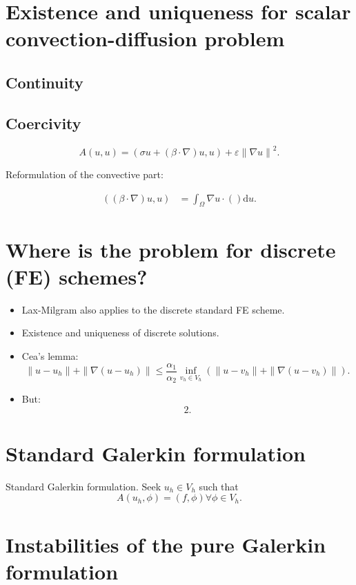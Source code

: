 \documentclass[
	a4paper,
	11pt,
	oneside
]{scrreprt}
\theoremstyle{definition}
\begin{document}
\section{Existence and uniqueness for scalar convection-diffusion problem}

\subsection{Continuity}

\subsection{Coercivity}

\[ A\left(u,u\right)=\left(\sigma u+\left(\beta\cdot\nabla\right) u,u\right)+\varepsilon{\|\nabla u\|}^{2}. \]

Reformulation of the convective part:

\begin{align*}
	\left(\left(\beta\cdot\nabla\right)u,u\right)&=\int_{\Omega}\nabla u\cdot\left(\right)\mathrm{d}u.
\end{align*}

\section{Where is the problem for discrete (FE) schemes?}

\begin{itemize}
	\item Lax-Milgram also applies to the discrete standard FE scheme.
	\item Existence and uniqueness of discrete solutions.
	\item Cea's lemma: \[ \|u-u_{h}\|+\|\nabla\left(u-u_{h}\right)\|\leq\frac{\alpha_{1}}{\alpha_{2}}\inf_{v_{h}\in V_{h}}\left(\|u-v_{h}\|+\|\nabla(u-v_{h})\|\right). \]
	\item But: \[ 2. \]
\end{itemize}

\section{Standard Galerkin formulation}

Standard Galerkin formulation. Seek $u_{h}\in V_{h}$ such that \[ A\left(u_{h},\phi\right)=\left(f,\phi\right)\forall\phi\in V_{h}. \]

\section{Instabilities of the pure Galerkin formulation}
\end{document}
